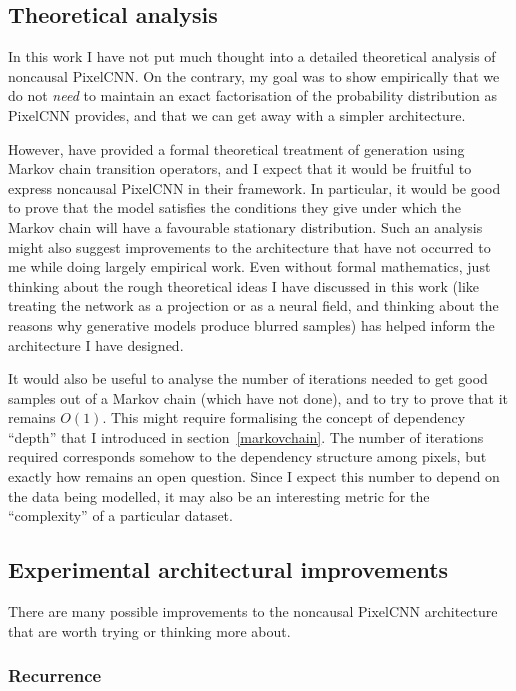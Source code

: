 \documentclass[11pt, a4paper, openany]{book}
\newcommand{\nquote}[1]{``{#1}''}
\begin{document}
\subsection{Theoretical analysis}

In this work I have not put much thought into a detailed theoretical analysis of noncausal PixelCNN. On the contrary, my goal was to show empirically that we do not \emph{need} to maintain an exact factorisation of the probability distribution as PixelCNN provides, and that we can get away with a simpler architecture.

However, \citet{gsn} have provided a formal theoretical treatment of generation using Markov chain transition operators, and I expect that it would be fruitful to express noncausal PixelCNN in their framework. In particular, it would be good to prove that the model satisfies the conditions they give under which the Markov chain will have a favourable stationary distribution. Such an analysis might also suggest improvements to the architecture that have not occurred to me while doing largely empirical work. Even without formal mathematics, just thinking about the rough theoretical ideas I have discussed in this work (like treating the network as a projection or as a neural field, and thinking about the reasons why generative models produce blurred samples) has helped inform the architecture I have designed.

It would also be useful to analyse the number of iterations needed to get good samples out of a Markov chain (which \citet{gsn} have not done), and to try to prove that it remains $O(1)$. This might require formalising the concept of dependency \nquote{depth} that I introduced in section~\ref{markovchain}. The number of iterations required corresponds somehow to the dependency structure among pixels, but exactly how remains an open question. Since I expect this number to depend on the data being modelled, it may also be an interesting metric for the \nquote{complexity} of a particular dataset.

\subsection{Experimental architectural improvements}

There are many possible improvements to the noncausal PixelCNN architecture that are worth trying or thinking more about.

\subsubsection{Recurrence}
\end{document}
